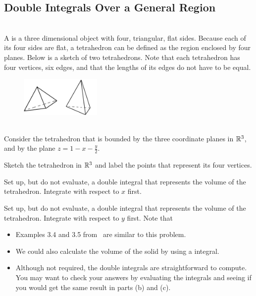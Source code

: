 \EEN %
\newpage
\subsection{Double Integrals Over a General Region}

\BEN
\item %
 \\
A  is a three dimensional object with four, triangular, flat sides. Because each of its four sides are flat, a tetrahedron can be defined as the region enclosed by four planes. Below is a sketch of two tetrahedrons. Note that each tetrahedron has four vertices, six edges, and that the lengths of its edges do not have to be equal.
\begin{figure}[h]
  \vspace{-1pt}
  \begin{center}
    \includegraphics[width=0.35\textwidth]{ImgTetrahedrons.jpg}
  \end{center}
\end{figure}\\
Consider the tetrahedron that is bounded by the three coordinate planes in $\mathbb{R}^3$, and by the plane $z = 1 - x - \frac{y}{2}$.
\BEN
\item Sketch the tetrahedron in $\mathbb{R}^3$ and label the points that represent its four vertices. 
\item Set up, but do not evaluate, a double integral that represents the volume of the tetrahedron. Integrate with respect to $x$ first. 
\item Set up, but do not evaluate, a double integral that represents the volume of the tetrahedron. Integrate with respect to $y$ first. 
\EEN
Note that
\begin{itemize}
\item Examples 3.4 and 3.5 from \VCT \ are similar to this problem. 
\item We could also calculate the volume of the solid by using a  integral. 
\item Although not required, the double integrals are straightforward to compute. You may want to check your answers by evaluating the integrals and seeing if you would get the same result in parts (b) and (c). 
\end{itemize}
